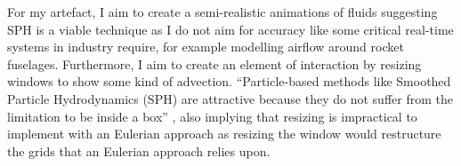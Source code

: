 \documentclass[write-up.tex]{subfiles}
\begin{document}
For my artefact, I aim to create a semi-realistic animations of fluids suggesting SPH is a viable technique as I do not aim for accuracy like some critical real-time systems in industry require, for example modelling airflow around rocket fuselages. Furthermore, I aim to create an element of interaction by resizing windows to show some kind of advection. ``Particle-based methods like Smoothed Particle Hydrodynamics (SPH) are attractive because they do not suffer from the limitation to be inside a box'' \cite{cohen}, also implying that resizing is impractical to implement with an Eulerian approach as resizing the window would restructure the grids that an Eulerian approach relies upon.
\vfill
\end{document}
